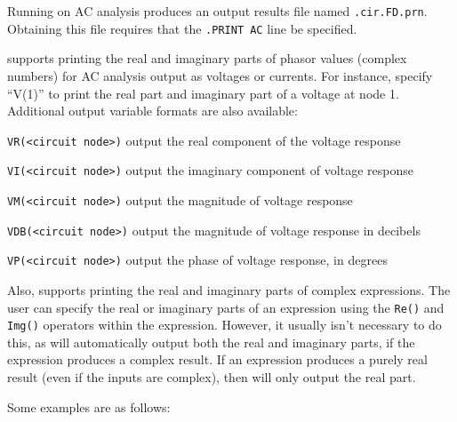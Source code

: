 \label{AC_print}

Running \Xyce{} on AC analysis produces an output results file named
\verb|.cir.FD.prn|. Obtaining this file requires that the
\verb|.PRINT AC| line be specified.

\Xyce{} supports printing the real and imaginary parts of phasor
values (complex numbers) for AC analysis output as voltages or
currents. For instance, specify ``V(1)'' to print the real part and
imaginary part of a voltage at node 1. Additional output variable
formats are also available:
\begin{XyceItemize}
\item \texttt{VR(<circuit node>)} output the real component of the voltage response
\item \texttt{VI(<circuit node>)} output the imaginary component of voltage response
\item \texttt{VM(<circuit node>)} output the magnitude of voltage response
\item \texttt{VDB(<circuit node>)} output the magnitude of voltage response in decibels
\item \texttt{VP(<circuit node>)} output the phase of voltage response, in degrees
\end{XyceItemize}

Also, \Xyce{} supports printing the real and imaginary parts of 
complex expressions.  The user can specify the real or imaginary 
parts of an expression using the \texttt{Re()} and 
\texttt{Img()} operators within the expression.  However, it usually 
isn't necessary to do this, as \Xyce{} will automatically output 
both the real and imaginary parts, if the expression produces a 
complex result.  If an expression produces a purely real result 
(even if the inputs are complex), then \Xyce{} will only output 
the real part.

Some examples are as follows: 

